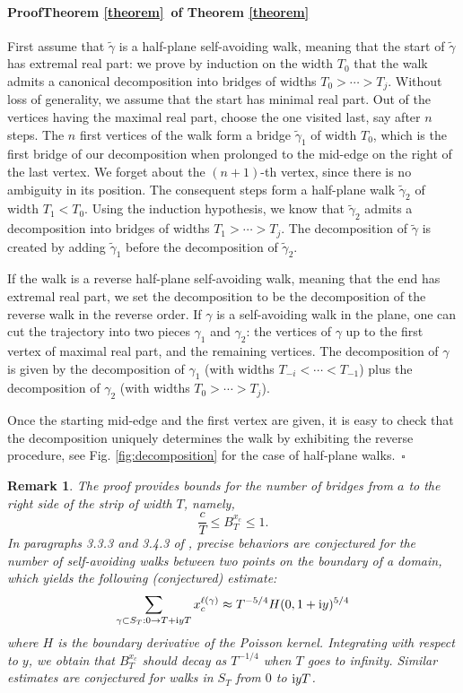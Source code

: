 \documentclass[a4paper,oneside,12pt]{article}
\newtheorem{remark}{Remark}
\newcommand{\g}{\gamma}
\newenvironment{proof}[1][\relax]%
  {\paragraph{Proof\ifx#1\relax\else~of #1\fi}}%
  {~\hfill$\square$\par\bigskip}
\begin{document}
\begin{proof}[Theorem \ref{theorem}]
First assume that $\tilde{\g}$ is a half-plane self-avoiding walk, meaning that the start of $\tilde{\g}$ has extremal real part: we prove by induction on the width $T_0$ that the walk admits a canonical decomposition into bridges of widths $T_0>\cdots>T_j$. Without loss of generality, we assume that the start has minimal real part. Out of the vertices having the maximal real part, choose the one visited last, say after $n$ steps. The $n$ first vertices of the walk form a bridge $\tilde{\g}_1$ of width $T_0$, which is the first bridge of our decomposition when prolonged to the mid-edge on the right of the last vertex. We forget about the $(n+1)$-th vertex, since there is no ambiguity in its position. The consequent steps form a half-plane walk $\tilde{\g}_2$ of width $T_1<T_0$. Using the induction hypothesis, we know that $\tilde{\g}_2$ admits a decomposition into bridges of widths $T_1>\cdots>T_j$. The decomposition of $\tilde{\g}$ is created by adding $\tilde{\g}_1$ before the decomposition of $\tilde{\g}_2$. 

If the walk is a reverse half-plane self-avoiding walk, meaning that the end has extremal real part, we set the decomposition to be the decomposition of the reverse walk in the reverse order. If $\g$ is a self-avoiding walk in the plane, one can cut the trajectory into two pieces $\g_1$ and $\g_2$: the vertices of $\g$ up to the first vertex of maximal real part, and the remaining vertices. The decomposition of $\g$ is given by the decomposition of $\g_1$ (with widths $T_{-i}<\cdots <T_{-1}$) plus the decomposition of $\g_2$ (with widths $T_0>\cdots >T_j$). 

Once the starting mid-edge and the first vertex are given, it is easy to check that the decomposition uniquely determines the walk by exhibiting the reverse procedure, see Fig. \ref{fig:decomposition} for the case of half-plane walks.\end{proof}

\begin{remark}\label{remark}
The proof provides bounds for the number of bridges from $a$ to the right side of the strip of width $T$, namely, 
$$\frac{c}{T}\leq B_T^{x_c}\leq 1.$$
In paragraphs 3.3.3 and 3.4.3 of \cite{LawlerSchrammWerner}, precise behaviors are conjectured for the number of self-avoiding walks between two points on the boundary of a domain, which yields the following (conjectured) estimate:
$$\sum_{\gamma\subset S_T:0\rightarrow T+{\rm i}yT} x_c^{\ell(\gamma)} \approx T^{-5/4} H(0,1+{\rm i}y)^{5/4}$$
where $H$ is the boundary derivative of the Poisson kernel. Integrating with respect to $y$, we obtain that $B_T^{x_c}$ should decay as $T^{-1/4}$ when $T$ goes to infinity. Similar estimates are conjectured for walks in $S_T$ from $0$ to ${\rm i}yT$. 
\end{remark}
\end{document}
